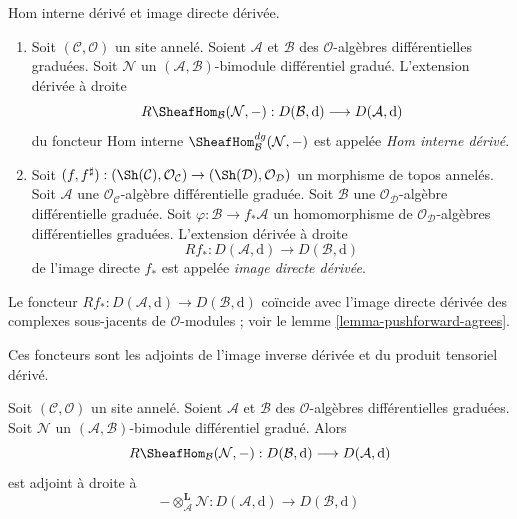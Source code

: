 \begin{definition}
\label{definition-pushforward}
Hom interne dérivé et image directe dérivée.
\begin{enumerate}
\item Soit $(\mathcal{C}, \mathcal{O})$ un site annelé.
Soient $\mathcal{A}$ et $\mathcal{B}$ des $\mathcal{O}$-algèbres différentielles graduées.
Soit $\mathcal{N}$ un $(\mathcal{A}, \mathcal{B})$-bimodule différentiel gradué. L'extension dérivée à droite
$$
R\SheafHom_\mathcal{B}(\mathcal{N}, -) :
D(\mathcal{B}, \text{d})
\longrightarrow
D(\mathcal{A}, \text{d})
$$
du foncteur Hom interne $\SheafHom_\mathcal{B}^{dg}(\mathcal{N}, -)$ est appelée {\it Hom interne dérivé}.
\item Soit $(f, f^\sharp) : (\Sh(\mathcal{C}), \mathcal{O}_\mathcal{C}) \to (\Sh(\mathcal{D}), \mathcal{O}_\mathcal{D})$ un morphisme de topos annelés.
Soit $\mathcal{A}$ une $\mathcal{O}_\mathcal{C}$-algèbre différentielle graduée.
Soit $\mathcal{B}$ une $\mathcal{O}_\mathcal{D}$-algèbre différentielle graduée.
Soit $\varphi : \mathcal{B} \to f_*\mathcal{A}$ un homomorphisme de $\mathcal{O}_\mathcal{D}$-algèbres différentielles graduées. L'extension dérivée à droite
$$
Rf_* :
D(\mathcal{A}, \text{d})
\longrightarrow
D(\mathcal{B}, \text{d})
$$
de l'image directe $f_*$ est appelée {\it image directe dérivée}.
\end{enumerate}
\end{definition}

\noindent
Le foncteur $Rf_* : D(\mathcal{A}, \text{d}) \to D(\mathcal{B}, \text{d})$ coïncide avec l'image directe dérivée des complexes sous-jacents de $\mathcal{O}$-modules ; voir le lemme \ref{lemma-pushforward-agrees}.

\medskip\noindent
Ces foncteurs sont les adjoints de l'image inverse dérivée et du produit tensoriel dérivé.

\begin{lemma}
\label{lemma-derived-adjoint-tensor-hom}
Soit $(\mathcal{C}, \mathcal{O})$ un site annelé.
Soient $\mathcal{A}$ et $\mathcal{B}$ des $\mathcal{O}$-algèbres différentielles graduées.
Soit $\mathcal{N}$ un $(\mathcal{A}, \mathcal{B})$-bimodule différentiel gradué. Alors
$$
R\SheafHom_\mathcal{B}(\mathcal{N}, -) :
D(\mathcal{B}, \text{d})
\longrightarrow
D(\mathcal{A}, \text{d})
$$
est adjoint à droite à
$$
- \otimes_\mathcal{A}^\mathbf{L} \mathcal{N} :
D(\mathcal{A}, \text{d})
\longrightarrow
D(\mathcal{B}, \text{d})
$$
\end{lemma}

